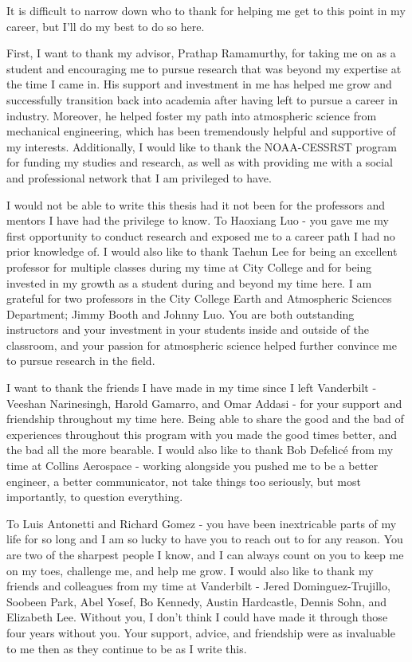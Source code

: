 \begin{singlespacing}
It is difficult to narrow down who to thank for helping me get to this point in my career, but I'll do my best to do so here.

First, I want to thank my advisor, Prathap Ramamurthy, for taking me on as a student and encouraging me to pursue research that was beyond my expertise at the time I came in. His support and investment in me has helped me grow and successfully transition back into academia after having left to pursue a career in industry. Moreover, he helped foster my path into atmospheric science from mechanical engineering, which has been tremendously helpful and supportive of my interests. Additionally, I would like to thank the NOAA-CESSRST program for funding my studies and research, as well as with providing me with a social and professional network that I am privileged to have.

I would not be able to write this thesis had it not been for the professors and mentors I have had the privilege to know. To Haoxiang Luo - you gave me my first opportunity to conduct research and exposed me to a career path I had no prior knowledge of. I would also like to thank Taehun Lee for being an excellent professor for multiple classes during my time at City College and for being invested in my growth as a student during and beyond my time here. I am grateful for two professors in the City College Earth and Atmospheric Sciences Department; Jimmy Booth and Johnny Luo. You are both outstanding instructors and your investment in your students inside and outside of the classroom, and your passion for atmospheric science helped further convince me to pursue research in the field.

I want to thank the friends I have made in my time since I left Vanderbilt - Veeshan Narinesingh, Harold Gamarro, and Omar Addasi - for your support and friendship throughout my time here. Being able to share the good and the bad of experiences throughout this program with you made the good times better, and the bad all the more bearable. I would also like to thank Bob Defelicé from my time at Collins Aerospace - working alongside you pushed me to be a better engineer, a better communicator, not take things too seriously, but most importantly, to question everything.

To Luis Antonetti and Richard Gomez - you have been inextricable parts of my life for so long and I am so lucky to have you to reach out to for any reason. You are two of the sharpest people I know, and I can always count on you to keep me on my toes, challenge me, and help me grow. I would also like to thank my friends and colleagues from my time at Vanderbilt - Jered Dominguez-Trujillo, Soobeen Park, Abel Yosef, Bo Kennedy, Austin Hardcastle, Dennis Sohn, and Elizabeth Lee. Without you, I don't think I could have made it through those four years without you. Your support, advice, and friendship were as invaluable to me then as they continue to be as I write this.


\end{singlespacing}
